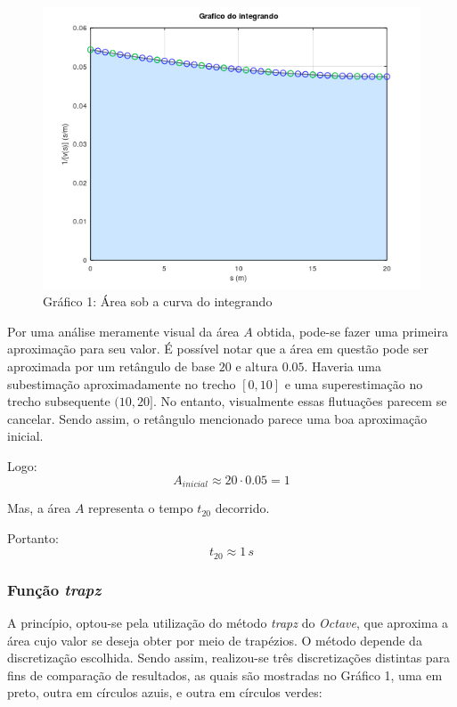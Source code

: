 \documentclass[a4paper, 12pt]{article}
\begin{document}
	\begin{figure}[H]
		\centering
		\includegraphics[scale=1]{g3.png}
		\caption{Gráfico 1: Área sob a curva do integrando}
	\end{figure}
	
	Por uma análise meramente visual da área $A$ obtida, pode-se fazer uma primeira aproximação para seu valor. É possível 
	notar que a área em questão pode ser aproximada por um retângulo de base $20$ e altura $0.05$. Haveria uma subestimação 
	aproximadamente no trecho $[0,10]$ e uma superestimação no trecho subsequente $(10,20]$. No entanto, visualmente essas
	flutuações parecem se cancelar. Sendo assim, o retângulo mencionado parece uma boa aproximação inicial.
	
	Logo: $$A_{inicial}\approx 20\cdot 0.05=1$$
	
	Mas, a área $A$ representa o tempo $t_{20}$ decorrido. 
	
	Portanto: $$t_{20}\approx 1\,s$$
	
	\newpage
	
	\subsubsection{Função \textit{trapz}}
	
	A princípio, optou-se pela utilização do método \textit{trapz} do \textit{Octave}, que aproxima a área cujo valor 
	se deseja obter por meio de trapézios. O método depende da discretização escolhida. Sendo assim, realizou-se três
	discretizações distintas para fins de comparação de resultados, as quais são mostradas no Gráfico 1, uma em preto,
	outra em círculos azuis, e outra em círculos verdes:
	
\end{document}
